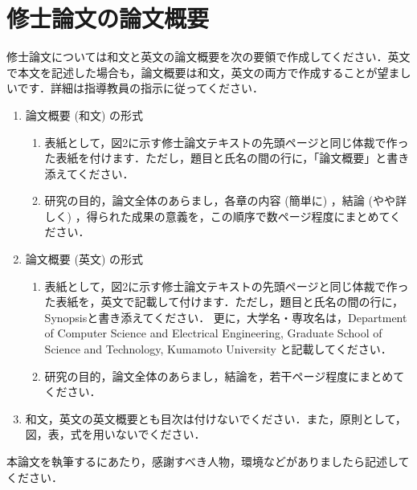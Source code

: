 \documentclass{kupaper}
\begin{document}

\chapter{修士論文の論文概要}
修士論文については和文と英文の論文概要を次の要領で作成してください．英文で本文を記述した場合も，論文概要は和文，英文の両方で作成することが望ましいです．詳細は指導教員の指示に従ってください．

\begin{enumerate}[1.]
	\item 論文概要 (和文) の形式
	      \begin{enumerate}[(1)]
	      	\item 表紙として，図2に示す修士論文テキストの先頭ページと同じ体裁で作った表紙を付けます．ただし，題目と氏名の間の行に，「論文概要」と書き添えてください．
	      	\item 研究の目的，論文全体のあらまし，各章の内容 (簡単に) ，結論 (やや詳しく) ，得られた成果の意義を，この順序で数ページ程度にまとめてください．
	      \end{enumerate}
	\item 論文概要 (英文) の形式
	      \begin{enumerate}[(1)]
	      	\item 表紙として，図2に示す修士論文テキストの先頭ページと同じ体裁で作った表紙を，英文で記載して付けます．ただし，題目と氏名の間の行に，Synopsisと書き添えてください．
	      	      更に，大学名・専攻名は，Department of Computer Science and Electrical Engineering, Graduate School of Science and Technology, Kumamoto University と記載してください．
	      	\item 研究の目的，論文全体のあらまし，結論を，若干ページ程度にまとめてください．
	      \end{enumerate}
	\item 和文，英文の英文概要とも目次は付けないでください．また，原則として，図，表，式を用いないでください．
\end{enumerate}


\begin{thanks}
	本論文を執筆するにあたり，感謝すべき人物，環境などがありましたら記述してください．
\end{thanks}



\end{document}
